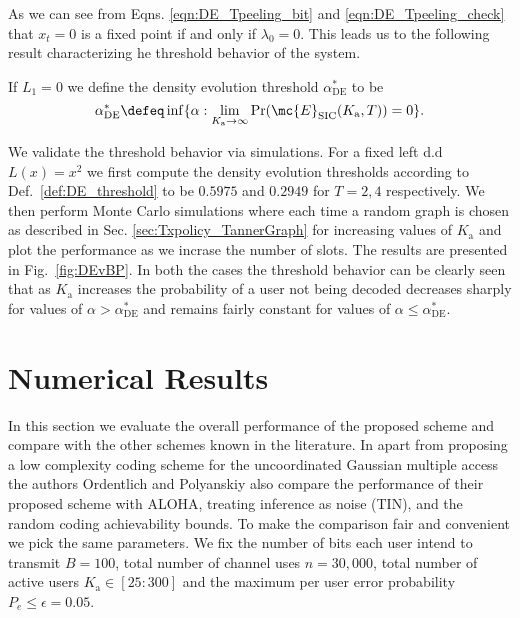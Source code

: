 \documentclass[final,onecolumn,12pt]{IEEEtran}
\def\Ka{K_{\text{a}}}
\def\Pr{\mathrm{Pr}}
\begin{document}
As we can see from Eqns. \eqref{eqn:DE_Tpeeling_bit} and \eqref{eqn:DE_Tpeeling_check} that $x_t=0$ is a fixed point if and only if $\lambda_0=0$. This leads us to the following result characterizing he threshold behavior of the system.
\begin{definition}
If $L_1=0$ we define the density evolution threshold $\alpha^*_{\text{DE}}$ to be
\[
\alpha^*_{\text{DE}}\defeq \inf \{\alpha: \lim_{\Ka\rightarrow \infty} \Pr(\mc{E}_{\text{SIC}}(\Ka,T))=0\}.
\]
\label{def:DE_threshold}
\end{definition}

We validate the threshold behavior via simulations.  For a fixed left d.d $L(x)=x^2$ we first compute the density evolution thresholds according to Def.~\ref{def:DE_threshold} to be $0.5975$ and $0.2949$ for $T=2,4$ respectively. We then perform Monte Carlo simulations where each time a random graph is chosen as described in Sec. \ref{sec:Txpolicy_TannerGraph} for increasing values of $\Ka$ and plot the performance as we incrase the number of slots. The results are presented in Fig.~\ref{fig:DEvBP}. In both the cases the threshold behavior can be clearly seen that as $\Ka$ increases the probability of a user not being decoded decreases sharply for values of $\alpha>\alpha_{\text{DE}}^*$ and remains fairly constant for values of $\alpha\leq\alpha_{\text{DE}}^*$.

\section{Numerical Results}
In this section we evaluate the overall performance of the proposed scheme and compare with the other schemes known in the literature. In \cite{ordentlich17} apart from proposing a low complexity coding scheme for the uncoordinated Gaussian multiple access the authors Ordentlich and Polyanskiy also compare the performance of their proposed scheme with ALOHA, treating inference as noise (TIN), and the random coding achievability bounds. To make the comparison fair and convenient we pick the same parameters. We fix the number of bits each user intend to transmit $B=100$,  total number of channel uses $n=30,000$, total number of active users $\Ka\in [25:300]$ and the maximum per user error probability $P_e\leq \epsilon=0.05$.
\end{document}
